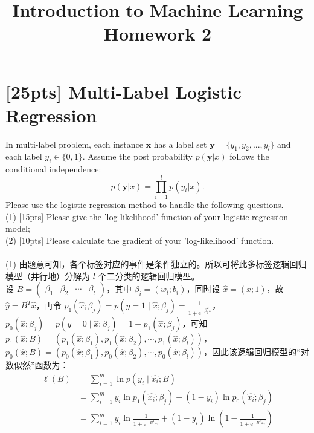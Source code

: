 \documentclass{article}
\title{Introduction to Machine Learning\\Homework 2}
\begin{document}
    \setlength{\baselineskip}{20pt}
	\maketitle
	\section{[25pts] Multi-Label Logistic Regression}
    \noindent In multi-label problem, each instance $\bm{x}$ has a label set $\bm{y}=\{y_1,y_2,...,y_l\}$ and each label $y_i\in\{0,1\}$. Assume the post probability $p(\bm{y}|x)$ follows the conditional independence:\\
    \begin{equation}
    p(\bm{y}|x)=\prod\limits_{i=1}^l p(y_i|x).
    \end{equation}
    Please use the logistic regression method to handle the following questions.\\
    (1) [15pts] Please give the 'log-likelihood' function of your logistic regression model;\\
    (2) [10pts] Please calculate the gradient of your 'log-likelihood' function.\\ \\
    (1) 由题意可知，各个标签对应的事件是条件独立的。所以可将此多标签逻辑回归模型（并行地）分解为 $l$ 个二分类的逻辑回归模型。\\
        设 $B = \begin{pmatrix} \beta_1 & \beta_2 & \cdots & \beta_l \end{pmatrix}$，其中 $\beta_{i} = (w_i;b_i)$，同时设 $\hat{x} = (x;1)$，故 $\hat{y} = B^T \hat{x}$，再令 $p_1(\hat{x};\beta_{j}) = p(y=1\mid\hat{x};\beta_{j}) = \frac{1}{1 + \mathrm{e}^{-\beta_j^T \hat{x}}}$，$p_0(\hat{x};\beta_{j}) = p(y=0\mid\hat{x};\beta_{j}) = 1-p_1(\hat{x};\beta_{j})$，可知 $p_1(\hat{x};B) = \left(p_1(\hat{x};\beta_1), p_1(\hat{x};\beta_2), \cdots, p_1(\hat{x};\beta_l)\right)$，$p_0(\hat{x};B) = \left(p_0(\hat{x};\beta_1), p_0(\hat{x};\beta_2), \cdots, p_0(\hat{x};\beta_l)\right)$，因此该逻辑回归模型的“对数似然”函数为：\\
        \begin{equation}
        \begin{aligned}
        \ell(B)
        &= \sum_{i=1}^{m} \ln p(y_i\mid \hat{x_i};B) \\
        &= \sum_{i=1}^{m} y_i\ln p_1(\hat{x_i};\beta_{j}) + (1-y_i)\ln p_0(\hat{x_i};\beta_{j}) \\
        &= \sum_{i=1}^{m} y_i\ln\frac{1}{1+\mathrm{e}^{-B^{T}\hat{x_i}}} + (1-y_i)\ln \left(1-\frac{1}{1+\mathrm{e}^{-B^{T}\hat{x_i}}}\right)\\
        \end{aligned}
        \end{equation} \\
\end{document}
